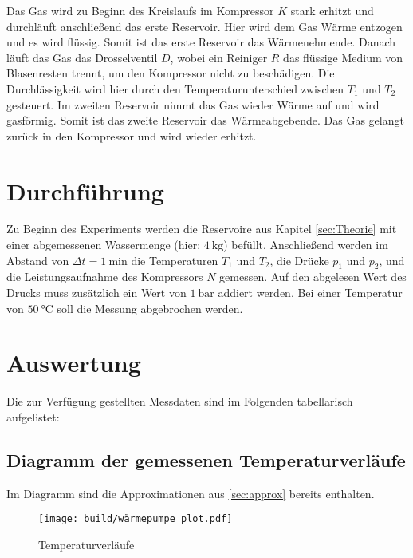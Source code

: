     Das Gas wird zu Beginn des Kreislaufs im Kompressor $K$ stark erhitzt und durchläuft anschließend das erste Reservoir.
    Hier wird dem Gas Wärme entzogen und es wird flüssig. Somit ist das erste Reservoir das Wärmenehmende.
    Danach läuft das Gas das Drosselventil $D$, wobei ein Reiniger $R$ das flüssige Medium von Blasenresten trennt, um den Kompressor nicht zu beschädigen.
    Die Durchlässigkeit wird hier durch den Temperaturunterschied zwischen $T_1$ und $T_2$ gesteuert.
    Im zweiten Reservoir nimmt das Gas wieder Wärme auf und wird gasförmig. Somit ist das zweite Reservoir das Wärmeabgebende.
    Das Gas gelangt zurück in den Kompressor und wird wieder erhitzt.


\section{Durchführung} \label{sec:Durchführung}
    Zu Beginn des Experiments werden die Reservoire aus Kapitel \ref{sec:Theorie} mit einer abgemessenen Wassermenge (hier: $\SI{4}{\kilogram}$) befüllt.
    Anschließend werden im Abstand von $\Delta t = \SI{1}{\minute}$ die Temperaturen $T_1$ und $T_2$, die Drücke $p_1$ und $p_2$, und die Leistungsaufnahme des Kompressors $N$ gemessen.
    Auf den abgelesen Wert des Drucks muss zusätzlich ein Wert von $\SI{1}{\bar}$ addiert werden.
    Bei einer Temperatur von $\SI{50}{\celsius}$ soll die Messung abgebrochen werden.

\section{Auswertung} \label{sec:Auswertung}
Die zur Verfügung gestellten Messdaten sind im Folgenden tabellarisch aufgelistet:


\newpage
\subsection{Diagramm der gemessenen Temperaturverläufe} %
Im Diagramm sind die Approximationen aus \ref{sec:approx} bereits enthalten.

\begin{figure}
  \centering
  \texttt{[image: build/wärmepumpe\_plot.pdf]}
  \caption{Temperaturverläufe}
  \label{fig:plot}
\end{figure}

